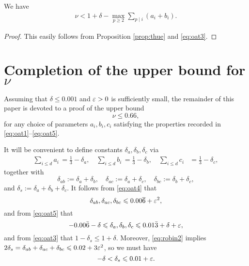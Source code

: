 \begin{proposition*}
We have
\begin{align*}
\nu < 1 +\delta- \max_{p\ge2}\sum_{p\mid i}(a_i+b_i).
\end{align*}
\end{proposition*}
\begin{proof}
This easily  follows from Proposition \ref{prop:thue} and \eqref{eq:oat3}.
\end{proof}




\section{Completion of the upper bound for \texorpdfstring{$\nu$}{nu}}

Assuming that
 $\delta\leq 0.001$ and
$\varepsilon>0$ is sufficiently small,
the remainder of this paper is devoted to a proof of the upper bound
$$\nu \le 0.66,
$$
for any choice of parameters $a_i,b_i ,c_i$ satisfying the properties recorded in \eqref{eq:oat1}--\eqref{eq:oat5}.


It will be convenient to define constants $\delta_a,\delta_b,\delta_c$ via
\begin{align}\label{eq:ai1/3}
\sum_{i\leq d} a_i \, = \frac{1}{3}-\delta_a, \quad \sum_{i\leq d} b_i \, = \frac{1}{3}-\delta_b, \quad \sum_{i\leq d} c_i &= \frac{1}{3}-\delta_c,
\end{align}
together with
$$
\delta_{ab}:=\delta_a+\delta_b,\quad  \delta_{ac}:=\delta_a+\delta_c, \quad \delta_{bc}:=\delta_b+\delta_c,
$$
and $\delta_s := \delta_a+\delta_b+\delta_c$. It follows from \eqref{eq:oat4} that
\begin{equation}\label{eq:robin2}
\delta_{ab}, \delta_{ac}, \delta_{bc} \leqslant 0.00\overline{6} + \varepsilon^2,
\end{equation}
and from \eqref{eq:oat5} that
\begin{equation}\label{eq:robin1}
-0.00\bar 6 - \delta
\leqslant \delta_a,\delta_b,\delta_c \leqslant
0.01\bar3+\delta+\varepsilon,
\end{equation}
and from \eqref{eq:oat3} that
$
1-\delta_s\leq 1+\delta.
$
Moreover, \eqref{eq:robin2} implies $2\delta_s = \delta_{ab}+ \delta_{ac}+ \delta_{bc}\leqslant 0.02 + 3\varepsilon^2$, so we must have
\begin{equation}\label{eq:robin3}
-\delta <
\delta_s \leqslant 0.01+\varepsilon.
\end{equation}

